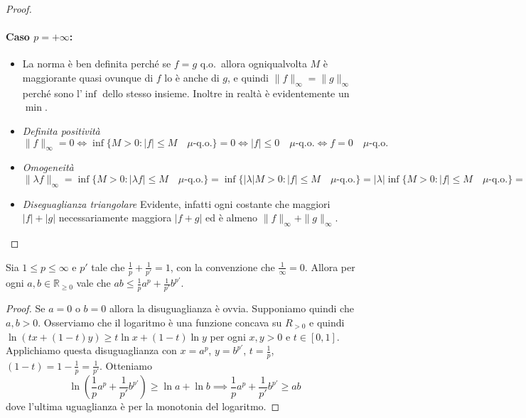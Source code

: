 \begin{proof}
\paragraph{Caso \(p = +\infty\):}
\begin{itemize}[label = --]
    \item La norma è ben definita perché se \(f = g\) q.o.~allora ogniqualvolta
        \(M\) è maggiorante quasi ovunque di \(f\) lo è anche di \(g\), e quindi
        \(\|f\|_{\infty} = \|g\|_{\infty}\) perché sono l'\(\inf\)  dello stesso
        insieme. Inoltre in realtà è evidentemente un \(\min\).
    \item \emph{Definita positività} \(\|f\|_{\infty} = 0 \iff \inf \{M > 0 : |f|
        \le M \quad \mu\text{-q.o.} \} = 0 \iff |f| \le 0 \quad \mu\text{-q.o.}
        \iff f = 0 \quad \mu\text{-q.o.}\)
    \item \emph{Omogeneità} \(\|\lambda f\|_{\infty} = \inf \{M > 0 : |\lambda f| \le M
        \quad \mu\text{-q.o.} \} = \inf \{|\lambda| M > 0 : |f| \le M \quad
        \mu\text{-q.o.} \} = |\lambda| \inf \{M > 0 : |f| \le M \quad
        \mu\text{-q.o.} \} = |\lambda| \|f\|_{\infty}\)
    \item \emph{Diseguaglianza triangolare} Evidente, infatti ogni costante che
        maggiori \(|f| + |g|\) necessariamente maggiora \(|f + g|\) ed è almeno
        \(\|f\|_\infty + \|g\|_\infty\).
\end{itemize}
\end{proof}

\begin{proposition}\label{prp:Young}
    Sia \(1 \le p \le \infty\) e \(p'\) tale che \(\frac{1}{p} + \frac{1}{p'} =
    1\), con la convenzione che \(\frac{1}{\infty} = 0\). Allora per ogni \(a,
    b \in \mathbb{R}_{\ge 0} \) vale che \(ab \le \frac{1}{p} a^{p}
    +\frac{1}{p'} b^{p'}\).
\end{proposition}
\begin{proof}
    Se \(a=0\) o \(b=0\) allora la disuguaglianza è ovvia. Supponiamo quindi che
    \(a, b > 0\). Osserviamo che il logaritmo è una funzione concava su \(R_{>0}
    \) e quindi \(\ln(tx + (1-t)y) \ge t \ln x + (1-t) \ln y\) per ogni \(x, y >
    0\) e \(t \in [0, 1]\). Applichiamo questa disuguaglianza con \(x = a^{p}\),
    \(y = b^{p'}\), \(t = \frac{1}{p}\), \((1-t) = 1 - \frac{1}{p} =
    \frac{1}{p'}\). Otteniamo
    \[
        \ln\left(\frac{1}{p} a^{p} + \frac{1}{p'} b^{p'}\right) \ge \ln a + \ln b \implies
        \frac{1}{p} a^{p} + \frac{1}{p'} b^{p'} \ge ab
    \]
    dove l'ultima uguaglianza è per la monotonia del logaritmo.
\end{proof}

